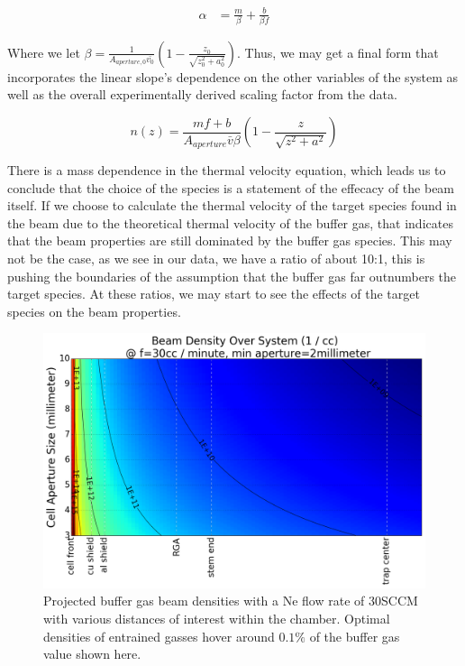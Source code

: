 \begin{align*}
	\alpha & = \frac{m}{\beta}+\frac{b}{\beta f}
\end{align*}

Where we let $\beta = \frac{1}{A_{aperture, 0} \bar{v_0}}\left(1-\frac{z_0}{\sqrt{z_0^2+a_0^2}}\right)$. Thus, we may get a final form that incorporates the linear slope's dependence on the other variables of the system as well as the overall experimentally derived scaling factor from the data.

\begin{equation*}
	n(z) = \frac{mf+b}{A_{aperture} \bar{v} \beta}\left(1-\frac{z}{\sqrt{z^2+a^2}}\right)
\end{equation*}

There is a mass dependence in the thermal velocity equation, which leads us to conclude that the choice of the species is a statement of the effecacy of the beam itself. If we choose to calculate the thermal velocity of the target species found in the beam due to the theoretical thermal velocity of the buffer gas, that indicates that the beam properties are still dominated by the buffer gas species. This may not be the case, as we see in our data, we have a ratio of about 10:1, this is pushing the boundaries of the assumption that the buffer gas far outnumbers the target species. At these ratios, we may start to see the effects of the target species on the beam properties.

\begin{figure}[H]
	\centering
	\includegraphics[width=1\textwidth]{images/CBGB_beam_density_over_system.png}
	\caption{Projected buffer gas beam densities with a Ne flow rate of 30SCCM with various distances of interest within the chamber. Optimal densities of entrained gasses hover around $0.1\%$ of the buffer gas value shown here.}
	\label{f: beam_density}
\end{figure}

